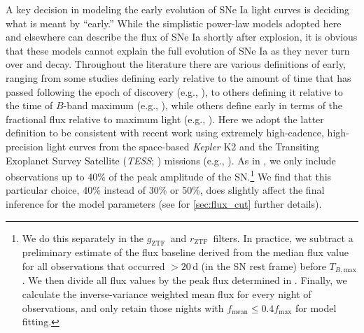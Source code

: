\documentclass[twocolumn]{aastex63}
\newcommand{\rztf}{$r_\mathrm{ZTF}$}
\newcommand{\gztf}{$g_\mathrm{ZTF}$}
\newcommand{\tbmax}{$T_{B,\mathrm{max}}$}
\begin{document}
A key decision in modeling the early evolution of SNe Ia light curves is
deciding what is meant by ``early.'' While the simplistic power-law models
adopted here and elsewhere can describe the flux of SNe Ia shortly after
explosion, it is obvious that these models cannot explain the full evolution
of SNe Ia as they never turn over and decay. Throughout the literature there
are various definitions of early, ranging from some studies defining early
relative to the amount of time that has passed following the epoch of
discovery (e.g., \citealt{Nugent11,Zheng13,Miller18}), to others defining it
relative to the time of $B$-band maximum (e.g.,
\citealt{Riess99a,Aldering00,Conley06,Dimitriadis19}), while others define
early in terms of the fractional flux relative to maximum light (e.g.,
\citealt{Olling15,Firth15,Fausnaugh19}). Here we adopt the latter definition
to be consistent with recent work using extremely high-cadence, high-precision
light curves from the space-based \textit{Kepler} K2 \citep{Howell14} and the
Transiting Exoplanet Survey Satellite (\textit{TESS}; \citealt{Ricker15})
missions (e.g., \citealt{Olling15,Fausnaugh19}). As in \citet{Olling15}, we
only include observations up to 40\% of the peak amplitude of the
SN.\footnote{We do this separately in the \gztf\ and \rztf\ filters. In
practice, we subtract a preliminary estimate of the flux baseline derived from
the median flux value for all observations that occurred $>20$\,d (in the SN
rest frame) before \tbmax. We then divide all flux values by the peak flux
determined in \citet{Yao19}. Finally, we calculate the inverse-variance
weighted mean flux for every night of observations, and only retain those
nights with $f_\mathrm{mean} \le 0.4 f_\mathrm{max}$ for model fitting.} We
find that this particular choice, 40\% instead of 30\% or 50\%, does slightly
affect the final inference for the model parameters (see for
\ref{sec:flux_cut} further details).
\end{document}
